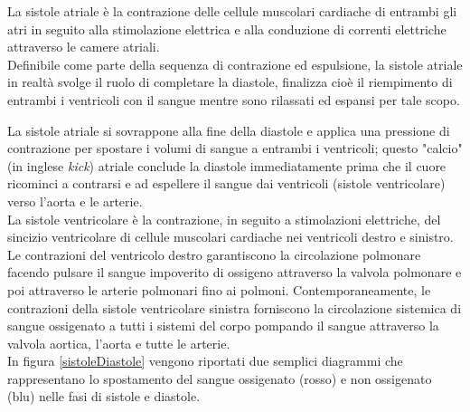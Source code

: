 La sistole atriale è la contrazione delle cellule muscolari cardiache di entrambi gli atri in seguito alla stimolazione elettrica e alla conduzione di correnti elettriche attraverso le camere atriali. \\
Definibile come parte della sequenza di contrazione ed espulsione, la sistole atriale in realtà svolge il ruolo di completare la diastole, finalizza cioè il riempimento di entrambi i ventricoli con il sangue mentre sono rilassati ed espansi per tale scopo. 

\newpage

La sistole atriale si sovrappone alla fine della diastole e applica una pressione di contrazione per spostare i volumi di sangue a entrambi i ventricoli; questo "calcio" (in inglese \textit{kick}) atriale conclude la diastole immediatamente prima che il cuore ricominci a contrarsi e ad espellere il sangue dai ventricoli (sistole ventricolare) verso l'aorta e le arterie.\\

La sistole ventricolare è la contrazione, in seguito a stimolazioni elettriche, del sincizio ventricolare di cellule muscolari cardiache nei ventricoli destro e sinistro. \\
Le contrazioni del ventricolo destro garantiscono la circolazione polmonare facendo pulsare il sangue impoverito di ossigeno attraverso la valvola polmonare e poi attraverso le arterie polmonari fino ai polmoni. Contemporaneamente, le contrazioni della sistole ventricolare sinistra forniscono la circolazione sistemica di sangue ossigenato a tutti i sistemi del corpo pompando il sangue attraverso la valvola aortica, l'aorta e tutte le arterie.\\
In figura \ref{sistoleDiastole} vengono riportati due semplici diagrammi che rappresentano lo spostamento del sangue ossigenato (rosso) e non ossigenato (blu) nelle fasi di sistole e diastole.

